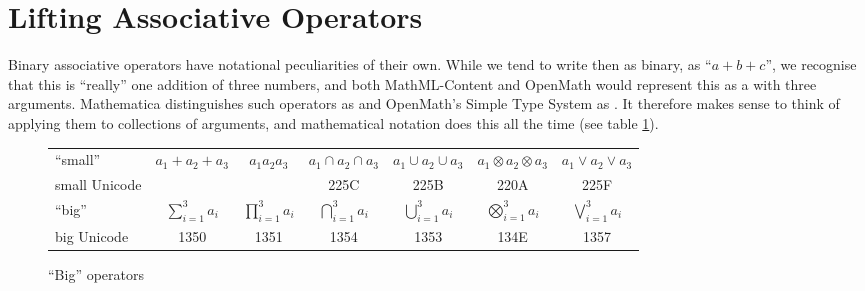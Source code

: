 \documentclass{llncs}
\begin{document}
\section{Lifting Associative Operators}
Binary associative operators have notational peculiarities of their own. While we tend to
write then as binary, as ``$a+b+c$'', we recognise that this is ``really'' one addition of
three numbers, and both MathML-Content and OpenMath would represent this as a
{} with three arguments. Mathematica distinguishes such operators as
{} and OpenMath's Simple Type System \cite{Davenport2000c} as
{}. It therefore makes sense to think of applying them to collections of
arguments, and mathematical notation does this all the time (see table \ref{Tab:big}).

\begin{figure}[h]\vspace*{-1.5em}
\begin{tabular}{lcccccc}\hline
``small''&$a_1+a_2+a_3$&$a_1a_2a_3$&$a_1\cap a_2\cap a_3$
&$a_1\cup a_2\cup a_3$
&$a_1\otimes a_2\otimes a_3$
&$a_1\lor a_2\lor a_3$
\\
small Unicode&&&225C&225B&220A&225F\\
``big''&$\sum_{i=1}^3 a_i$&$\prod_{i=1}^3 a_i$&$\bigcap_{i=1}^3 a_i$
&$\bigcup_{i=1}^3 a_i$
&$\bigotimes_{i=1}^3 a_i$
&$\bigvee_{i=1}^3 a_i$
\\
big Unicode&1350&1351&1354&1353&134E&1357\\\hline
\end{tabular}\vspace*{-.5em}
\caption{``Big'' operators}\label{Tab:big}\vspace*{-2em}
\end{figure}
\end{document}
